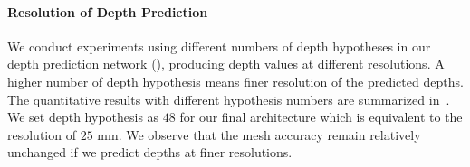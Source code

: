 \paragraph{Resolution of Depth Prediction}
We conduct experiments using different numbers of depth hypotheses in our depth prediction network (), producing depth values at different resolutions.
A higher number of depth hypothesis means finer resolution of the predicted depths.
The quantitative results with different hypothesis numbers are summarized in~. We set depth hypothesis as $48$ for our final architecture which is equivalent to the resolution of $25$ mm.
We observe that the mesh accuracy remain relatively unchanged if we predict depths at finer resolutions.


